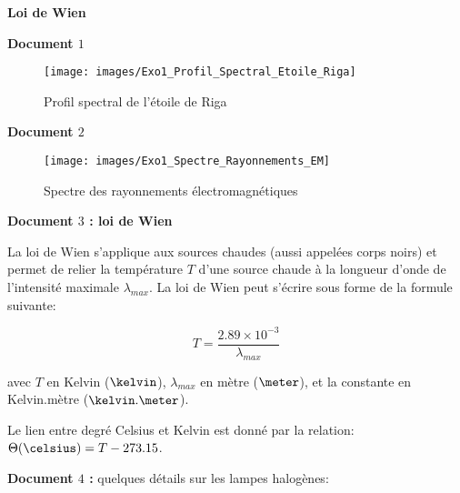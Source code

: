 \exo \textbf{Loi de Wien}

\vspace{0.3cm}

\textbf{Document $1$}

\begin{figure}[h]
\begin{center}
\texttt{[image: images/Exo1\_Profil\_Spectral\_Etoile\_Riga]}
\end{center}
\caption{\label{fig:Profil_Spectral_Etoile_Riga}
Profil spectral de l'étoile de Riga}\end{figure}

\vspace{0.3cm}

\textbf{Document $2$}

\begin{figure}[h]
\begin{center}
\texttt{[image: images/Exo1\_Spectre\_Rayonnements\_EM]}
\end{center}
\caption{\label{fig:Spectre_Rayonnements_EM}
Spectre des rayonnements électromagnétiques}\end{figure}

\vspace{0.3cm}

\textbf{Document $3$ : loi de Wien}

\vspace{0.3cm}

La loi de Wien s'applique aux sources chaudes (aussi appelées corps noirs) et permet de relier la température $T$ d'une source chaude à la longueur d'onde de l'intensité maximale $\lambda_{max}$. La loi de Wien peut s'écrire sous forme de la formule suivante:

$$T = \frac{2.89 \times 10^{-3}}{\lambda_{max}}$$

avec $T$ en Kelvin ($\kelvin$), $\lambda_{max}$ en mètre ($\meter$), et la constante en Kelvin.mètre ($\kelvin.\meter$).

\vspace{0.3cm}

Le lien entre degré Celsius et Kelvin est donné par la relation: $\Theta(\celsius) = T - 273.15$.

\vspace{0.3cm}

\textbf{Document $4$ :} quelques détails sur les lampes halogènes:

\vspace{0.3cm}

